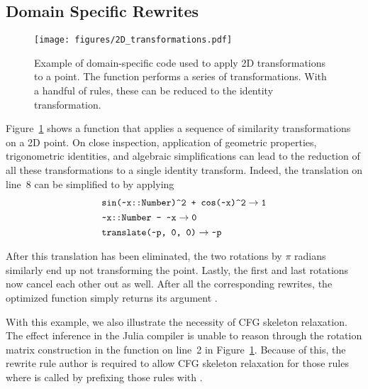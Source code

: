 \subsection{Domain Specific Rewrites}
\begin{figure}
    \centering
    \texttt{[image: figures/2D\_transformations.pdf]}
    \caption{Example of domain-specific code used to apply 2D transformations to a point.
    The function performs a series of transformations. With a handful of rules, these can be reduced to the identity transformation.}
    \label{fig:2D transformations}
\end{figure}
Figure~\ref{fig:2D transformations} shows a function that applies a sequence of similarity transformations on a 2D point.
On close inspection, application of geometric properties, trigonometric identities, and algebraic simplifications can lead to the reduction of all these transformations to a single identity transform.
Indeed, the translation on line~8 can be simplified to  by applying
{
\begin{align*}
&\code{sin(\char`\~x::Number)\char`\^2 + cos(\char`\~x)\char`\^2} \rightarrow \code{1}
\\
&\code{\char`\~x::Number - \char`\~x} \rightarrow \code{0}
\\
&\code{translate(\char`\~p, 0, 0)} \rightarrow \code{\char`\~p}
\end{align*}
}

After this translation has been eliminated, the two rotations by $\pi$ radians similarly end up not transforming the point.
Lastly, the first and last rotations now cancel each other out as well.
After all the corresponding rewrites, the optimized function simply returns its argument .

With this example, we also illustrate the necessity of CFG skeleton relaxation.
The effect inference in the Julia compiler is unable to reason through the rotation matrix construction in the  function on line~2 in Figure~\ref{fig:2D transformations}.
Because of this, the rewrite rule author is required to allow CFG skeleton relaxation for those rules where  is called by prefixing those rules with .


